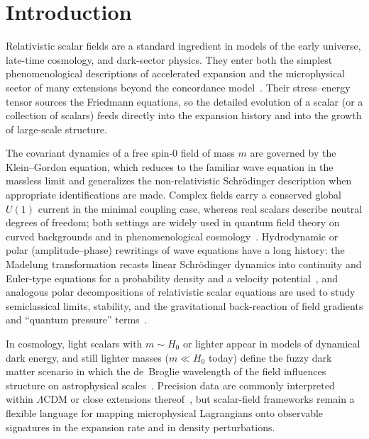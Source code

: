 
\section{Introduction}
\label{sec:introduction}

Relativistic scalar fields are a standard ingredient in models of the early universe, late-time cosmology, and dark-sector physics.
They enter both the simplest phenomenological descriptions of accelerated expansion and the microphysical sector of many extensions beyond the concordance model~\cite{Guth1981,Planck2018}.
Their stress--energy tensor sources the Friedmann equations, so the detailed evolution of a scalar (or a collection of scalars) feeds directly into the expansion history and into the growth of large-scale structure.

The covariant dynamics of a free spin-$0$ field of mass $m$ are governed by the Klein--Gordon equation, which reduces to the familiar wave equation in the massless limit and generalizes the non-relativistic Schr\"odinger description when appropriate identifications are made.
Complex fields carry a conserved global $U(1)$ current in the minimal coupling case, whereas real scalars describe neutral degrees of freedom; both settings are widely used in quantum field theory on curved backgrounds and in phenomenological cosmology~\cite{Suarez2015}.
Hydrodynamic or polar (amplitude--phase) rewritings of wave equations have a long history: the Madelung transformation recasts linear Schr\"odinger dynamics into continuity and Euler-type equations for a probability density and a velocity potential~\cite{Madelung1927}, and analogous polar decompositions of relativistic scalar equations are used to study semiclassical limits, stability, and the gravitational back-reaction of field gradients and ``quantum pressure'' terms~\cite{Suarez2015}.

In cosmology, light scalars with $m \sim H_0$ or lighter appear in models of dynamical dark energy, and still lighter masses ($m \ll H_0$ today) define the fuzzy dark matter scenario in which the de~Broglie wavelength of the field influences structure on astrophysical scales~\cite{Hu2000,Marsh2016}.
Precision data are commonly interpreted within $\Lambda$CDM or close extensions thereof~\cite{Planck2018}, but scalar-field frameworks remain a flexible language for mapping microphysical Lagrangians onto observable signatures in the expansion rate and in density perturbations.

